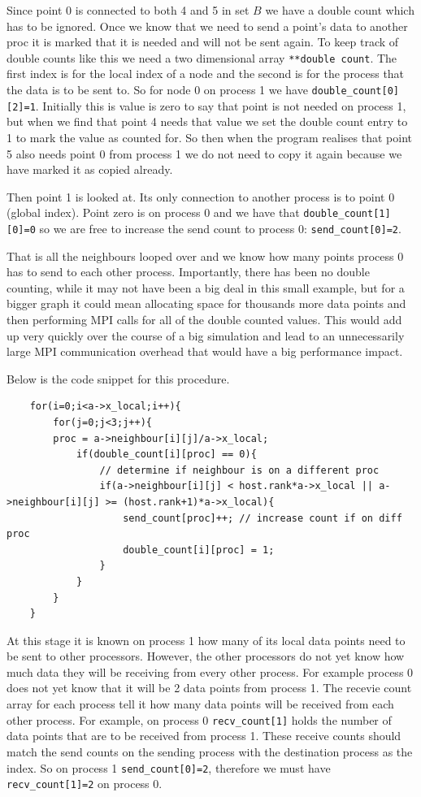 \documentclass[pdftex,12pt,a4paper]{article}
\begin{document}
Since point 0 is connected to both 4 and 5 in set $B$ we have a double count which has to be ignored. Once we know that we need to send a point's data to another proc it is marked that it is needed and will not be sent again. To keep track of double counts like this we need a two dimensional array \verb|**double count|. The first index is for the local index of a node and the second is for the process that the data is to be sent to. So for node 0 on process 1 we have \verb|double_count[0][2]=1|. Initially this is value is zero to say that point is not needed on process 1, but when we find that point 4 needs that value we set the double count entry to 1 to mark the value as counted for. So then when the program realises that point 5 also needs point 0 from process 1 we do not need to copy it again because we have marked it as copied already.

Then point 1 is looked at. Its only connection to another process is to point 0 (global index). Point zero is on process 0 and we have that \verb|double_count[1][0]=0| so we are free to increase the send count to process 0: \verb|send_count[0]=2|.

That is all the neighbours looped over and we know how many points process 0 has to send to each other process. Importantly, there has been no double counting, while it may not have been a big deal in this small example, but for a bigger graph it could mean allocating space for thousands more data points and then performing MPI calls for all of the double counted values. This would add up very quickly over the course of a big simulation and lead to an unnecessarily large MPI communication overhead that would have a big performance impact.

Below is the code snippet for this procedure.


\begin{lstlisting}
	for(i=0;i<a->x_local;i++){
		for(j=0;j<3;j++){
		proc = a->neighbour[i][j]/a->x_local;
			if(double_count[i][proc] == 0){
				// determine if neighbour is on a different proc
				if(a->neighbour[i][j] < host.rank*a->x_local || a->neighbour[i][j] >= (host.rank+1)*a->x_local){
					send_count[proc]++; // increase count if on diff proc
					double_count[i][proc] = 1;
				}
			}
		}
	}
\end{lstlisting}


At this stage it is known on process 1 how many of its local data points need to be sent to other processors. However, the other processors do not yet know how much data they will be receiving from every other process. For example process 0 does not yet know that it will be 2 data points from process 1. The recevie count array for each process tell it how many data points will be received from each other process. For example, on process 0 \verb|recv_count[1]| holds the number of data points that are to be received from process 1. These receive counts should match the send counts on the sending process with the destination process as the index. So on process 1 \verb|send_count[0]=2|, therefore we must have \verb|recv_count[1]=2| on process 0.
\end{document}
